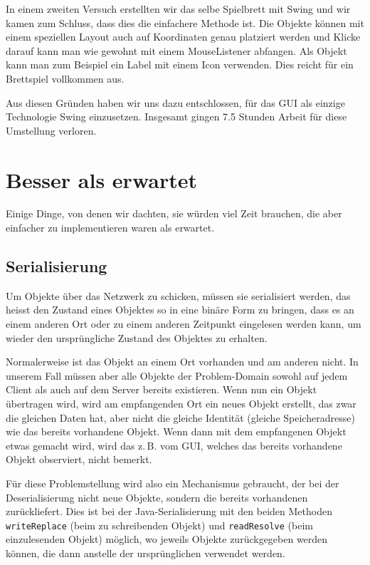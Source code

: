 \documentclass[12pt,halfparskip]{scrartcl}
\begin{document}
In einem zweiten Versuch erstellten wir das selbe Spielbrett mit Swing und wir kamen zum Schluss, dass dies die einfachere Methode ist. Die Objekte können mit einem speziellen Layout auch auf Koordinaten genau platziert werden und Klicke darauf kann man wie gewohnt mit einem MouseListener abfangen. Als Objekt kann man zum Beispiel ein Label mit einem Icon verwenden. Dies reicht für ein Brettspiel vollkommen aus.

Aus diesen Gründen haben wir uns dazu entschlossen, für das GUI als einzige Technologie Swing einzusetzen. Insgesamt gingen 7.5 Stunden Arbeit für diese Umstellung verloren.

\clearpage
\section{Besser als erwartet}

Einige Dinge, von denen wir dachten, sie würden viel Zeit brauchen, die aber einfacher zu implementieren waren als erwartet.

\subsection{Serialisierung}

Um Objekte über das Netzwerk zu schicken, müssen sie serialisiert werden, das heisst den Zustand eines Objektes so in eine binäre Form zu bringen, dass es an einem anderen Ort oder zu einem anderen Zeitpunkt eingelesen werden kann, um wieder den ursprüngliche Zustand des Objektes zu erhalten.

Normalerweise ist das Objekt an einem Ort vorhanden und am anderen nicht. In unserem Fall müssen aber alle Objekte der Problem-Domain sowohl auf jedem Client als auch auf dem Server bereits existieren. Wenn nun ein Objekt übertragen wird, wird am empfangenden Ort ein neues Objekt erstellt, das zwar die gleichen Daten hat, aber nicht die gleiche Identität (gleiche Speicheradresse) wie das bereits vorhandene Objekt. Wenn dann mit dem empfangenen Objekt etwas gemacht wird, wird das z.\,B. vom GUI, welches das bereits vorhandene Objekt observiert, nicht bemerkt.

Für diese Problemstellung wird also ein Mechanismus gebraucht, der bei der Deserialisierung nicht neue Objekte, sondern die bereits vorhandenen zurückliefert. Dies ist bei der Java-Serialisierung mit den beiden Methoden \texttt{writeReplace} (beim zu schreibenden Objekt) und \texttt{readResolve} (beim einzulesenden Objekt) möglich, wo jeweils Objekte zurückgegeben werden können, die dann anstelle der ursprünglichen verwendet werden.
\end{document}
